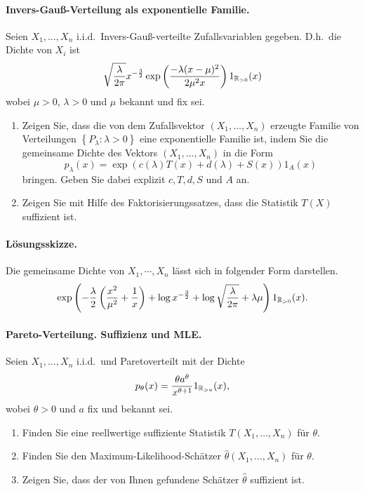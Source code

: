 \paragraph{Invers-Gauß-Verteilung als exponentielle Familie.}
Seien $X_1,\ldots,X_n$ i.i.d.\ Invers-Gauß-verteilte Zufallsvariablen gegeben. D.h.\ die Dichte
von $X_i$ ist 
\begin{equation*}
    \sqrt{\frac{\lambda}{2\pi}} x^{-\frac{3}{2}} \exp\left( \frac{-\lambda(x-\mu)^2}{2\mu^2 x} \right) 1_{\mathbb R_{>0}} (x)
\end{equation*}
wobei $\mu>0$, $\lambda>0$ und $\mu$ bekannt und fix sei.
\begin{enumerate}
    \item Zeigen Sie, dass die von dem Zufallsvektor $( X_1,\ldots,X_n)$
        erzeugte Familie von Verteilungen $\left\{ P_\lambda : \lambda>0
        \right\}$ eine exponentielle Familie ist, indem Sie die gemeinsame
        Dichte des Vektors $(X_1,\ldots,X_n)$ in die Form
        \begin{equation*}
            p_\lambda(x) = \exp\left( c(\lambda) T(x) + d(\lambda) + S(x) \right)1_A (x)
        \end{equation*}
        bringen. Geben Sie dabei explizit $c,T,d,S$ und $A$ an.
    \item Zeigen Sie mit Hilfe des Faktorisierungssatzes, dass die Statistik
        $T(X)$ suffizient ist.
\end{enumerate}

\paragraph*{Lösungsskizze.} Die gemeinsame Dichte von $X_1, \cdots, X_n$ 
lässt sich in folgender Form darstellen.
\begin{equation*}
    \exp\left(  -\frac{\lambda}{2}\left( \frac{x^2}{\mu^2} + \frac{1}{x} \right)    
    + \log x^{-\frac{3}{2}} + \log \sqrt{\frac{\lambda}{2\pi}} + 
    \lambda\mu  \right)1_{\mathbb R_{>0}}(x).
\end{equation*}



\paragraph{Pareto-Verteilung. Suffizienz und MLE.} Seien $X_1,\ldots,X_n$ i.i.d.\ und
Paretoverteilt mit der Dichte
\begin{equation*}
    p_\theta(x)= \frac{\theta a^\theta}{x^{\theta+1}}1_{\mathbb R_{>a}}(x),
\end{equation*}
wobei $\theta>0$ und $a$ fix und bekannt sei.
\begin{enumerate}
    \item Finden Sie eine reellwertige suffiziente Statistik $T(X_1,\ldots,X_n)$ für $\theta$.
    \item Finden Sie den Maximum-Likelihood-Schätzer $\hat \theta(X_1,\ldots,X_n)$ für $\theta$.
    \item Zeigen Sie, dass der von Ihnen gefundene Schätzer $\hat \theta$ suffizient ist.
\end{enumerate}

